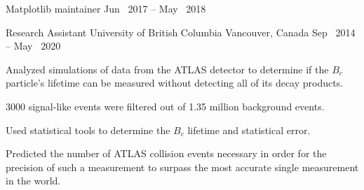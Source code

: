 

\begin{cventries}

  \cventry
    {Matplotlib maintainer} %
    {} %
    {} %
    {Jun \ 2017 -- May \ 2018} %
    {
      \begin{cvitems} %
      \end{cvitems}
    }

    \cventryWithTags
    {Research Assistant} %
    {University of British Columbia} %
    {Vancouver, Canada} %
    {Sep \ 2014 -- May \ 2020} %
    {    } %
    {
      \begin{cvitems} %
        \item {Analyzed simulations of data from the ATLAS detector to determine if the $B_c$ particle's lifetime can be measured without detecting all of its decay products.  }
        \item {3000 signal-like events were filtered out of 1.35 million background events.}
        \item {Used statistical tools to determine the $B_c$ lifetime and statistical error.}
        \item {Predicted the number of ATLAS collision events necessary in order for the precision of such a measurement to surpass the most accurate single measurement in the world.}
      \end{cvitems}
    }


\end{cventries}
